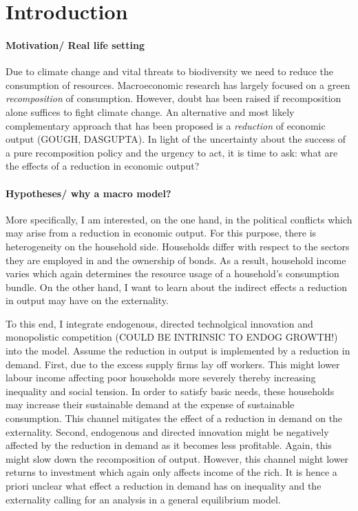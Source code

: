\section{Introduction}

\paragraph{Motivation/ Real life setting}
Due to climate change and vital threats to biodiversity we need to reduce the consumption of resources. %
Macroeconomic research has largely focused on a green \textit{recomposition} of consumption. However, doubt has been raised if recomposition alone suffices to fight climate change. An alternative and most likely complementary approach that has been proposed is a \textit{reduction} of economic output (GOUGH, DASGUPTA). %
In light of the uncertainty about the success of a pure recomposition policy and the urgency to act, it is time to ask: what are the effects of a reduction in economic output? 

\paragraph{Hypotheses/ why a macro model?}
More specifically, I am interested, on the one hand, in the political conflicts which may arise from a reduction in economic output. For this purpose, there is heterogeneity on the household side. 
Households differ with respect to the sectors they are employed in and the ownership of bonds. As a result, household income varies which again determines the resource usage of a household's consumption bundle.  
On the other hand, I want to learn about the indirect effects a reduction in output may have on the externality. 

To this end, I integrate  endogenous, directed technolgical innovation and monopolistic competition (COULD BE INTRINSIC TO ENDOG GROWTH!) into the model. Assume the reduction in output is implemented by a reduction in demand. First, due to the excess supply firms lay off workers. This might lower labour income affecting poor households more severely thereby increasing inequality and social tension. In order to satisfy basic needs, these households may increase their sustainable demand at the expense of sustainable consumption. This channel mitigates the effect of a reduction in demand on the externality. 
Second, endogenous and directed innovation might be negatively affected by the reduction in demand as it becomes less profitable. Again, this might slow down the recomposition of output. However, this channel might lower returns to investment which again only affects income of the rich. 
It is hence a priori unclear what effect a reduction in demand has on inequality and the externality calling for an analysis in a general equilibrium model. 

